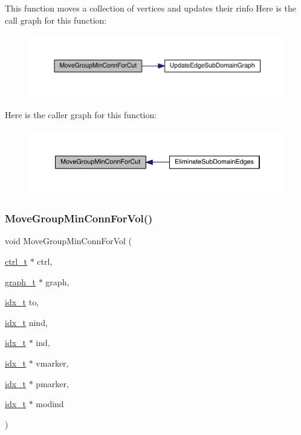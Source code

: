 This function moves a collection of vertices and updates their rinfo Here is the call graph for this function\+:\nopagebreak
\begin{figure}[H]
\begin{center}
\leavevmode
\includegraphics[width=350pt]{a00242_a39d997df18cf07ea8609a66db133a8b6_cgraph}
\end{center}
\end{figure}
Here is the caller graph for this function\+:\nopagebreak
\begin{figure}[H]
\begin{center}
\leavevmode
\includegraphics[width=350pt]{a00242_a39d997df18cf07ea8609a66db133a8b6_icgraph}
\end{center}
\end{figure}
\mbox{\label{a00242_acab0293e31c438218cd4b37b608466c6}} 
\subsubsection{\texorpdfstring{Move\+Group\+Min\+Conn\+For\+Vol()}{MoveGroupMinConnForVol()}}
{\footnotesize\ttfamily void Move\+Group\+Min\+Conn\+For\+Vol (\begin{DoxyParamCaption}\item[{\hyperlink{a00742}{ctrl\+\_\+t} $\ast$}]{ctrl,  }\item[{\hyperlink{a00734}{graph\+\_\+t} $\ast$}]{graph,  }\item[{\hyperlink{a00876_aaa5262be3e700770163401acb0150f52}{idx\+\_\+t}}]{to,  }\item[{\hyperlink{a00876_aaa5262be3e700770163401acb0150f52}{idx\+\_\+t}}]{nind,  }\item[{\hyperlink{a00876_aaa5262be3e700770163401acb0150f52}{idx\+\_\+t} $\ast$}]{ind,  }\item[{\hyperlink{a00876_aaa5262be3e700770163401acb0150f52}{idx\+\_\+t} $\ast$}]{vmarker,  }\item[{\hyperlink{a00876_aaa5262be3e700770163401acb0150f52}{idx\+\_\+t} $\ast$}]{pmarker,  }\item[{\hyperlink{a00876_aaa5262be3e700770163401acb0150f52}{idx\+\_\+t} $\ast$}]{modind }\end{DoxyParamCaption})}

